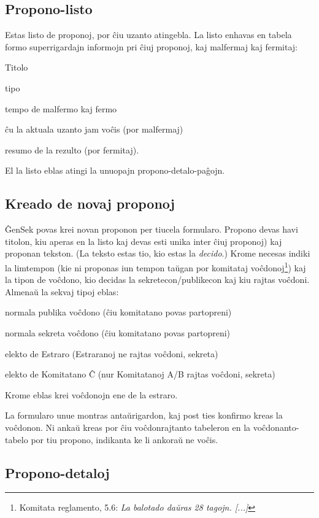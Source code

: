 \documentclass[draft]{scrartcl}
\newenvironment{itemize*}{%
  \begin{itemize}%
  \setlength{\itemsep}{0pt}%
  \setlength{\parsep}{0pt}%
  \setlength{\parskip}{2pt plus 1pt}
  \setlength{\topsep}{1pt}%
}{%
    \end{itemize}%
}
\begin{document}
\subsection{Propono-listo}

Estas listo de proponoj, por ĉiu uzanto atingebla. La listo
enhavas en tabela formo superrigardajn informojn pri ĉiuj proponoj,
kaj malfermaj kaj fermitaj:
\begin{itemize*}
\item Titolo
\item tipo
\item tempo de malfermo kaj fermo
\item ĉu la aktuala uzanto jam voĉis (por malfermaj)
\item resumo de la rezulto (por fermitaj).
\end{itemize*}
El la listo eblas atingi la unuopajn propono-detalo-paĝojn.

\subsection{Kreado de novaj proponoj}

ĜenSek povas krei novan proponon per tiucela formularo.
Propono devas havi titolon, kiu aperas en la listo kaj devas esti unika
inter ĉiuj proponoj) kaj proponan tekston. (La teksto estas tio, kio
estas la \emph{decido}.)
Krome necesas indiki la limtempon (kie ni proponas iun tempon taŭgan
por komitataj voĉdonoj\footnote{Komitata reglamento, 5.6:
  \emph{La balotado daŭras 28 tagojn. [...]}}) kaj la tipon de voĉdono,
  kio decidas la sekretecon/publikecon kaj kiu rajtas voĉdoni. Almenaŭ la
  sekvaj tipoj eblas:
\begin{itemize*}
\item normala publika voĉdono (ĉiu komitatano povas partopreni)
\item normala sekreta voĉdono (ĉiu komitatano povas partopreni)
\item elekto de Estraro (Estraranoj ne rajtas voĉdoni, sekreta)
\item elekto de Komitatano Ĉ (nur Komitatanoj A/B rajtas voĉdoni, sekreta)
\end{itemize*}
Krome eblas krei voĉdonojn ene de la estraro.

La formularo unue montras antaŭrigardon, kaj post ties konfirmo kreas
la voĉdonon. Ni ankaŭ kreas por ĉiu voĉdonrajtanto tabeleron en la
voĉdonanto-tabelo por tiu propono, indikanta ke li ankoraŭ ne voĉis.

\subsection{Propono-detaloj} \label{propono-detaloj}
\end{document}

